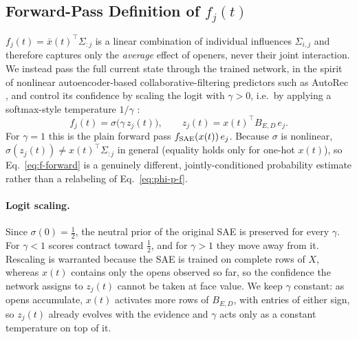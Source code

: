\subsection{Forward-Pass Definition of $f_j(t)$}
\label{sec:forward-f}

$f_j(t) = \bar x(t)^\top\Sigma_{:j}$ is a linear combination of individual
influences $\Sigma_{i,j}$ and therefore captures only the \emph{average}
effect of openers, never their joint interaction. We instead pass the full
current state through the trained network, in the spirit of nonlinear
autoencoder-based collaborative-filtering predictors such as AutoRec
\citep{sedhain2015autorec}, and control its confidence by scaling the logit
with $\gamma>0$, i.e.\ by applying a softmax-style temperature $1/\gamma$
\citep{guo2017calibration}:
\begin{equation}
\label{eq:f-forward}
f_j(t) = \sigma\big(\gamma\, z_j(t)\big),
\qquad
z_j(t) = x(t)^\top B_{E,D}\,e_j.
\end{equation}
For $\gamma=1$ this is the plain forward pass $f_{\mathrm{SAE}}(x(t))\,e_j$. Because
$\sigma$ is nonlinear, $\sigma(z_j(t)) \ne x(t)^\top\Sigma_{:j}$ in general
(equality holds only for one-hot $x(t)$), so Eq.~\eqref{eq:f-forward} is a
genuinely different, jointly-conditioned probability estimate rather than a
relabeling of Eq.~\eqref{eq:phi-p-f}.

\paragraph{Logit scaling.}
Since $\sigma(0)=\tfrac12$, the neutral prior of the original SAE is
preserved for every $\gamma$. For $\gamma<1$ scores contract toward
$\tfrac12$, and for $\gamma>1$ they
move away from it. Rescaling is
warranted because the SAE is trained on complete rows of $X$, whereas
$x(t)$ contains only the opens observed so far, so the confidence the
network assigns to $z_j(t)$ cannot be taken at face value. We keep $\gamma$
constant: as opens accumulate, $x(t)$ activates more rows of $B_{E,D}$, with
entries of either sign, so $z_j(t)$ already evolves with the evidence and
$\gamma$ acts only as a constant temperature on top of it.
